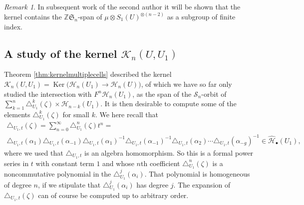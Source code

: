 \documentclass[12pt,letterpaper]{amsart}
\numberwithin{equation}{section}
\def\ZZ{{\mathbb Z}}
\def\tri{\triangle}
\def\Hcal{{\mathcal H}}
\def\Kcal{{\mathcal K}}
\def\Scal{{\mathcal S}}
\def\Sfrak{\mathfrak{S}}
\def\pt{{\scriptscriptstyle\bullet}}
\newcommand\Ker{\operatorname{Ker}}
\theoremstyle{remark}
\newtheorem{remark}[theorem]{Remark}
\begin{document}
\begin{remark}\label{rem:}
In subsequent work of the second author it will be shown  that the kernel contains the $\ZZ\Sfrak_n$-span of 
$\mu \otimes S_1(U)^{\otimes (n-2)}$ as a subgroup of finite index.
\end{remark}

 \subsection{A study of the kernel $\Kcal_n(U,U_1)$} 
Theorem \ref{thm:kernelmultiplecells} described the kernel $\Kcal_n(U, U_1)=\Ker\big(\Hcal_n(U_1)\to \Hcal_n(U)\big)$,
of which we have so far only studied the intersection with $F^n\Hcal_n(U_1)$, as the span of the $\Scal_n$-orbit of $\sum_{k=1}^n\tri^k_{U_1}(\zeta)\times \Hcal_{n-k}(U_1)$. It is then desirable to compute some of the elements $\tri^k_{U_1}(\zeta)$ for small $k$. We here recall that 
\begin{multline}\label{eqn:tri_exp}
\textstyle \tri_{{U_1},t}(\zeta)=\sum_{n=0}^\infty \tri_{U_1}^n(\zeta)t^n=\\
\tri_{{U_1},t}(\alpha_1)\tri_{{U_1},t}(\alpha_{-1})\tri_{{U_1},t}(\alpha_{1})^{-1}\tri_{{U_1},t}(\alpha_{-1})^{-1}\tri_{{U_1},t}(\alpha_2)\cdots 
\tri_{{U_1},t}(\alpha_{-g})^{-1} \in \widehat \Hcal_\pt({U_1}),
\end{multline}
where we used that $\tri_{{U_1},t}$ is an algebra homomorphism.
So this is a formal power series  in $t$ with constant term $1$ and  whose  $n$th  coefficient $\tri_{U_1}^n(\zeta)$ is a  noncommutative polynomial in  the $\tri_{U_1}^j(\alpha_i)$. That polynomial  is homogeneous  of degree $n$, if we stipulate that $\tri_{U_1}^j(\alpha_i)$ has degree $j$.  The expansion of $\tri_{{U_1},t}(\zeta)$ can of course be computed up to arbitrary order.  
\end{document}
